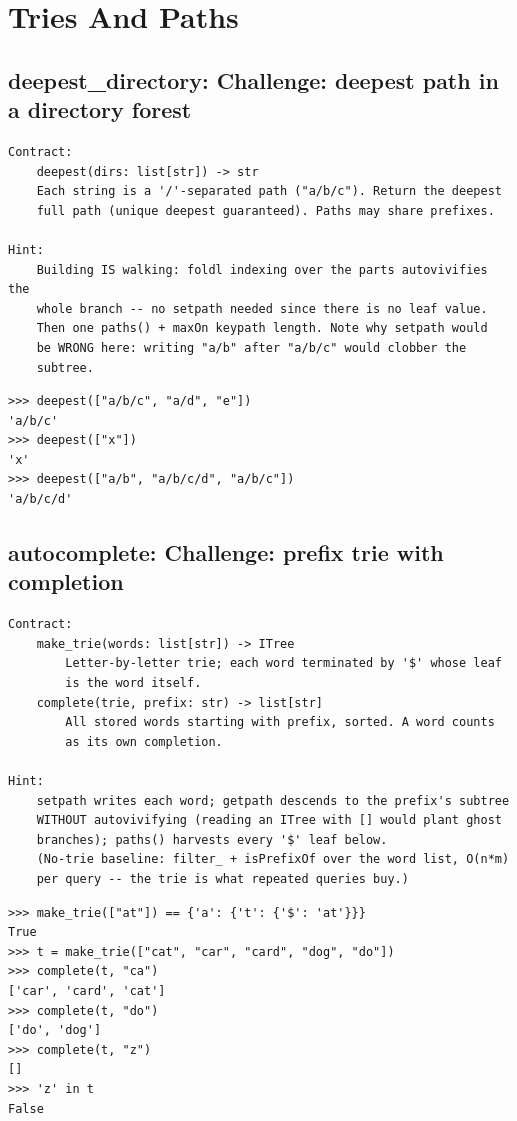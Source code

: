 \documentclass[10pt,letterpaper]{book}
\begin{document}
\chapter{Tries And Paths}

\section{deepest\_directory: Challenge: deepest path in a directory forest}
\begin{lstlisting}[style=ex]
Contract:
    deepest(dirs: list[str]) -> str
    Each string is a '/'-separated path ("a/b/c"). Return the deepest
    full path (unique deepest guaranteed). Paths may share prefixes.

Hint:
    Building IS walking: foldl indexing over the parts autovivifies the
    whole branch -- no setpath needed since there is no leaf value.
    Then one paths() + maxOn keypath length. Note why setpath would
    be WRONG here: writing "a/b" after "a/b/c" would clobber the
    subtree.
\end{lstlisting}
\begin{lstlisting}[style=ex]
>>> deepest(["a/b/c", "a/d", "e"])
'a/b/c'
>>> deepest(["x"])
'x'
>>> deepest(["a/b", "a/b/c/d", "a/b/c"])
'a/b/c/d'
\end{lstlisting}

\section{autocomplete: Challenge: prefix trie with completion}
\begin{lstlisting}[style=ex]
Contract:
    make_trie(words: list[str]) -> ITree
        Letter-by-letter trie; each word terminated by '$' whose leaf
        is the word itself.
    complete(trie, prefix: str) -> list[str]
        All stored words starting with prefix, sorted. A word counts
        as its own completion.

Hint:
    setpath writes each word; getpath descends to the prefix's subtree
    WITHOUT autovivifying (reading an ITree with [] would plant ghost
    branches); paths() harvests every '$' leaf below.
    (No-trie baseline: filter_ + isPrefixOf over the word list, O(n*m)
    per query -- the trie is what repeated queries buy.)
\end{lstlisting}
\begin{lstlisting}[style=ex]
>>> make_trie(["at"]) == {'a': {'t': {'$': 'at'}}}
True
>>> t = make_trie(["cat", "car", "card", "dog", "do"])
>>> complete(t, "ca")
['car', 'card', 'cat']
>>> complete(t, "do")
['do', 'dog']
>>> complete(t, "z")
[]
>>> 'z' in t
False
\end{lstlisting}
\end{document}

